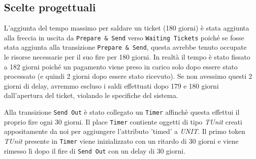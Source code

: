 \documentclass[../Relazione.tex]{subfiles}
\begin{document}
    \subsection{Scelte progettuali}
        L'aggiunta del tempo massimo per saldare un ticket (180 giorni) è stata aggiunta alla freccia in uscita da \texttt{Prepare \& Send} verso \texttt{Waiting Tickets} poiché se fosse stata aggiunta alla transizione \texttt{Prepare \& Send}, questa avrebbe tenuto occupate le risorse necessarie per il suo fire per 180 giorni. In realtà il tempo è stato fissato a 182 giorni poiché un pagamento viene preso in carico solo dopo essere stato processato (e quindi 2 giorni dopo essere stato ricevuto). Se non avessimo questi 2 giorni di delay, avremmo escluso i saldi effettuati dopo 179 e 180 giorni dall'apertura del ticket, violando le specifiche del sistema.
        
        Alla transizione \texttt{Send Out} è stato collegato un \texttt{Timer} affinchè questa effettui il proprio fire ogni 30 giorni. Il place \texttt{Timer} contiente oggetti di tipo \textit{TUnit} creati appositamente da noi per aggiungere l'attributo 'timed' a \textit{UNIT}. Il primo token \textit{TUnit} presente in \texttt{Timer} viene inizializzato con un ritardo di 30 giorni e viene rimesso lì dopo il fire di \texttt{Send Out} con un delay di 30 giorni.
        
\end{document}
